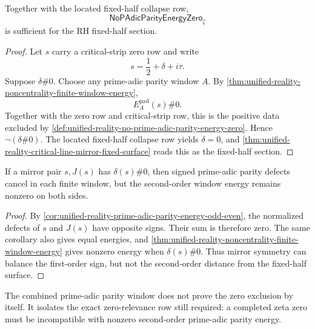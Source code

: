 \begin{theorem}
\label{thm:unified-reality-prime-adic-parity-energy-refusal-conditionally-sufficient}
Together with the located fixed-half collapse row,
$$
\mathsf{NoPAdicParityEnergyZero}_{\zeta}
$$
is sufficient for the RH fixed-half section.
\end{theorem}

\begin{proof}
Let $s$ carry a critical-strip zero row and write
$$
s=\frac12+\delta+i\tau.
$$
Suppose $\delta\#0$.  Choose any prime-adic parity window $A$.  By
\autoref{thm:unified-reality-noncentrality-finite-window-energy},
$$
E_A^{\mathrm{pad}}(s)\#0.
$$
Together with the zero row and critical-strip row, this is the positive
data excluded by
\autoref{def:unified-reality-no-prime-adic-parity-energy-zero}.  Hence
$\neg(\delta\#0)$.  The located fixed-half collapse row yields
$\delta=0$, and
\autoref{thm:unified-reality-critical-line-mirror-fixed-surface} reads
this as the fixed-half section.
\end{proof}

\begin{corollary}
\label{cor:unified-reality-mirror-balance-does-not-remove-prime-adic-parity-energy}
If a mirror pair $s,J(s)$ has $\delta(s)\#0$, then signed
prime-adic parity defects cancel in each finite window, but the
second-order window energy remains nonzero on both sides.
\end{corollary}

\begin{proof}
By
\autoref{cor:unified-reality-prime-adic-parity-energy-odd-even},
the normalized defects of $s$ and $J(s)$ have opposite signs.  Their
sum is therefore zero.  The same corollary also gives equal energies, and
\autoref{thm:unified-reality-noncentrality-finite-window-energy} gives
nonzero energy when $\delta(s)\#0$.  Thus mirror symmetry can balance the
first-order sign, but not the second-order distance from the fixed-half
surface.
\end{proof}

\begin{corollary}
\label{cor:unified-reality-combined-local-window-isolates-obstruction}
The combined prime-adic parity window does not prove the zero exclusion by
itself.  It isolates the exact zero-relevance row still required: a
completed zeta zero must be incompatible with nonzero second-order
prime-adic parity energy.
\end{corollary}

